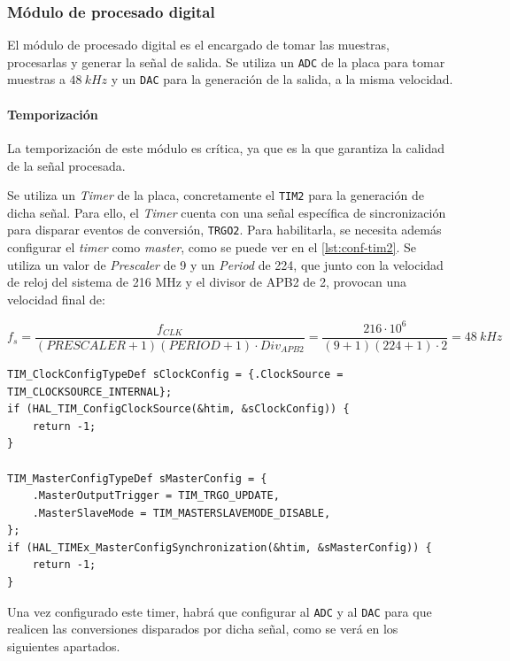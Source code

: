 \subsubsection{Módulo de procesado digital}

El módulo de procesado digital es el encargado de tomar las muestras, procesarlas y generar la señal de salida. Se utiliza un \texttt{ADC} de la placa para tomar muestras a $48\ kHz$ y un \texttt{DAC} para la generación de la salida, a la misma velocidad.

\paragraph{Temporización}
\label{para:temporizacion}

La temporización de este módulo es crítica, ya que es la que garantiza la calidad de la señal procesada. 

Se utiliza un \textit{Timer} de la placa, concretamente el \texttt{TIM2} para la generación de dicha señal. Para ello, el \textit{Timer} cuenta con una señal específica de sincronización para disparar eventos de conversión, \texttt{TRGO2}. Para habilitarla, se necesita además configurar el \textit{timer} como \textit{master}, como se puede ver en el \autoref{lst:conf-tim2}. Se utiliza un valor de \textit{Prescaler} de 9 y un \textit{Period} de 224, que junto con la velocidad de reloj del sistema de 216 MHz y el divisor de APB2 de 2, provocan una velocidad final de: 

\[
    f_s = \frac{f_{CLK}}{(PRESCALER + 1)(PERIOD + 1)\cdot Div_{APB2}} = \frac{216\cdot 10^6}{(9 + 1)(224 + 1)\cdot 2} = 48\ kHz
\]

\begin{lstlisting}[captionpos=t, caption={Configuración del TRGO del \textit{timer} de sincronización}]
TIM_ClockConfigTypeDef sClockConfig = {.ClockSource = TIM_CLOCKSOURCE_INTERNAL};
if (HAL_TIM_ConfigClockSource(&htim, &sClockConfig)) {
    return -1;
}

TIM_MasterConfigTypeDef sMasterConfig = {
    .MasterOutputTrigger = TIM_TRGO_UPDATE,
    .MasterSlaveMode = TIM_MASTERSLAVEMODE_DISABLE,
};
if (HAL_TIMEx_MasterConfigSynchronization(&htim, &sMasterConfig)) {
    return -1;
}
\end{lstlisting}

Una vez configurado este timer, habrá que configurar al \texttt{ADC} y al \texttt{DAC} para que realicen las conversiones disparados por dicha señal, como se verá en los siguientes apartados.

